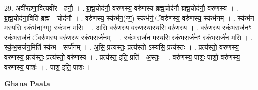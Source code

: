 \documentclass[17pt]{extarticle}
\begin{document}
29. अवी॑रहणा॒वित्यवी॑र - ह॒नौ॒ । . ब्र॒ह्म॒चोद॑नौ॒ वरु॑णस्य॒ वरु॑णस्य ब्रह्म॒चोद॑नौ ब्रह्म॒चोद॑नौ॒ वरु॑णस्य । . ब्र॒ह्म॒चोद॑ना॒विति॑ ब्रह्म - चोद॑नौ । . वरु॑णस्य॒ स्कंभ॑न॒(ग्ग्॒) स्कंभ॑नं॒ ॅवरु॑णस्य॒ वरु॑णस्य॒ स्कंभ॑नम् । . स्कंभ॑न मस्यसि॒ स्कंभ॑न॒(ग्ग्॒) स्कंभ॑न मसि । . अ॒सि॒ वरु॑णस्य॒ वरु॑णस्यास्यसि॒ वरु॑णस्य । . वरु॑णस्य स्कंभ॒सर्ज॑नꣳ स्कंभ॒सर्ज॑नं॒ ॅवरु॑णस्य॒ वरु॑णस्य स्कंभ॒सर्ज॑नम् । . स्कं॒भ॒सर्ज॑न मस्यसि स्कंभ॒सर्ज॑नꣳ स्कंभ॒सर्ज॑न मसि । . स्कं॒भ॒सर्ज॑न॒मिति॑ स्कंभ - सर्ज॑नम् । . अ॒सि॒ प्रत्य॑स्तः॒ प्रत्य॑स्तो ऽस्यसि॒ प्रत्य॑स्तः । . प्रत्य॑स्तो॒ वरु॑णस्य॒ वरु॑णस्य॒ प्रत्य॑स्तः॒ प्रत्य॑स्तो॒ वरु॑णस्य । . प्रत्य॑स्त॒ इति॒ प्रति॑ - अ॒स्तः॒ । . वरु॑णस्य॒ पाशः॒ पाशो॒ वरु॑णस्य॒ वरु॑णस्य॒ पाशः॑ । . पाश॒ इति॒ पाशः॑ । \newline

\textbf{Ghana Paata } \newline
\end{document}

